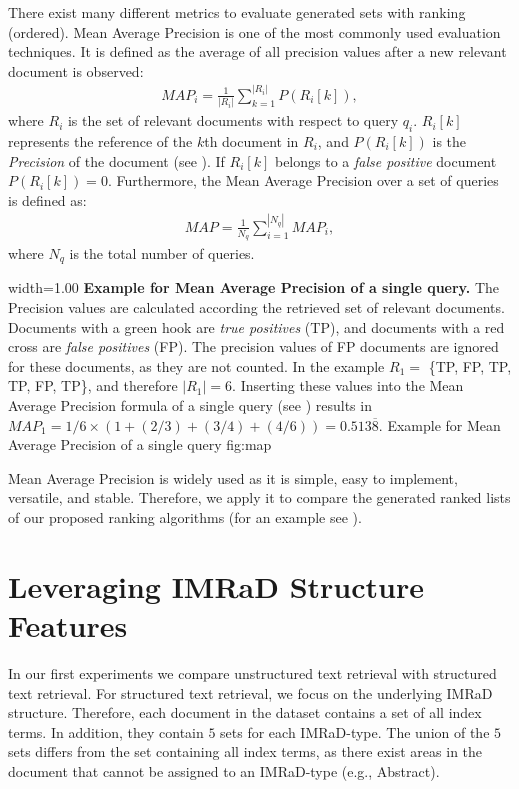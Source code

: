 There exist many different metrics to evaluate generated sets with ranking (ordered). Mean Average Precision is one of the most commonly used evaluation techniques. It is defined as the average of all precision values after a new relevant document is observed:
\begin{align}
  \label{map_of_a_single_query}
  \mathit{MAP}_i = \frac{1}{|R_i|}\sum_{k = 1}^{|R_i|} P(R_i[k]),
\end{align}
where $R_i$ is the set of relevant documents with respect to query $q_i$. $R_i[k]$ represents the reference of the $k$th document in $R_i$, and $P(R_i[k])$ is the \textit{Precision} of the document (see ). If $R_i[k]$ belongs to a \textit{false positive} document $P(R_i[k]) = 0$. Furthermore, the Mean Average Precision over a set of queries is defined as:
\begin{align}
  \mathit{MAP} = \frac{1}{N_q}\sum_{i = 1}^{|N_q|} \mathit{MAP}_i,
\end{align}
where $N_q$ is the total number of queries.

      {width=1.00\textwidth}
      {\textbf{Example for Mean Average Precision of a single query.} The Precision values are calculated according the retrieved set of relevant documents. Documents with a green hook are \textit{true positives} (TP), and documents with a red cross are \textit{false positives} (FP). The precision values of FP documents are ignored for these documents, as they are not counted. In the example $R_1 =$ \{TP, FP, TP, TP, FP, TP\}, and therefore $|R_1| = 6$. Inserting these values into the Mean Average Precision formula of a single query (see ) results in $\mathit{MAP}_1 = 1/6 \times (1 + (2/3) + (3/4) + (4/6)) = 0.513\overline{8}$.}
      {Example for Mean Average Precision of a single query}
      {fig:map}

 Mean Average Precision is widely used as it is simple, easy to implement, versatile, and stable. Therefore, we apply it to compare the generated ranked lists of our proposed ranking algorithms (for an example see ).


\section{Leveraging IMRaD Structure Features}
\label{sec:leveraging_imrad_structure_features}

In our first experiments we compare unstructured text retrieval with structured text retrieval. For structured text retrieval, we focus on the underlying IMRaD structure. Therefore, each document in the dataset contains a set of all index terms. In addition, they contain $5$ sets for each IMRaD-type. The union of the $5$ sets differs from the set containing all index terms, as there exist areas in the document that cannot be assigned to an IMRaD-type (e.g., Abstract). 

